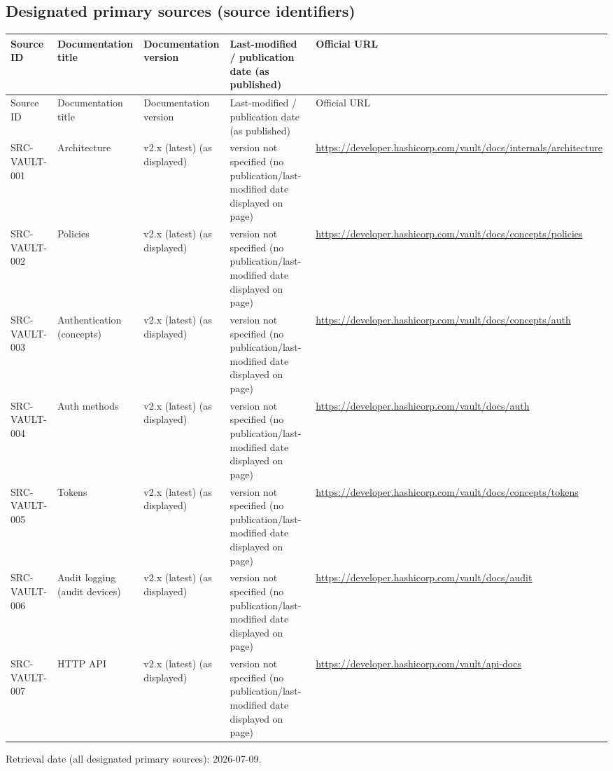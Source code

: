 \documentclass{article}
\begin{document}
\subsection*{Designated primary sources (source identifiers)}
\begin{longtable}{@{}p{}p{}p{}p{}p{}@{}}
\toprule
Source ID & Documentation title & Documentation version & Last-modified / publication date (as published) & Official URL\\
\midrule
\endfirsthead
\toprule
Source ID & Documentation title & Documentation version & Last-modified / publication date (as published) & Official URL\\
\midrule
\endhead
SRC-VAULT-001 & Architecture & v2.x (latest) (as displayed) & version not specified (no publication/last-modified date displayed on page) & \url{https://developer.hashicorp.com/vault/docs/internals/architecture}\\
SRC-VAULT-002 & Policies & v2.x (latest) (as displayed) & version not specified (no publication/last-modified date displayed on page) & \url{https://developer.hashicorp.com/vault/docs/concepts/policies}\\
SRC-VAULT-003 & Authentication (concepts) & v2.x (latest) (as displayed) & version not specified (no publication/last-modified date displayed on page) & \url{https://developer.hashicorp.com/vault/docs/concepts/auth}\\
SRC-VAULT-004 & Auth methods & v2.x (latest) (as displayed) & version not specified (no publication/last-modified date displayed on page) & \url{https://developer.hashicorp.com/vault/docs/auth}\\
SRC-VAULT-005 & Tokens & v2.x (latest) (as displayed) & version not specified (no publication/last-modified date displayed on page) & \url{https://developer.hashicorp.com/vault/docs/concepts/tokens}\\
SRC-VAULT-006 & Audit logging (audit devices) & v2.x (latest) (as displayed) & version not specified (no publication/last-modified date displayed on page) & \url{https://developer.hashicorp.com/vault/docs/audit}\\
SRC-VAULT-007 & HTTP API & v2.x (latest) (as displayed) & version not specified (no publication/last-modified date displayed on page) & \url{https://developer.hashicorp.com/vault/api-docs}\\
\bottomrule
\end{longtable}
Retrieval date (all designated primary sources): 2026-07-09.
\end{document}
